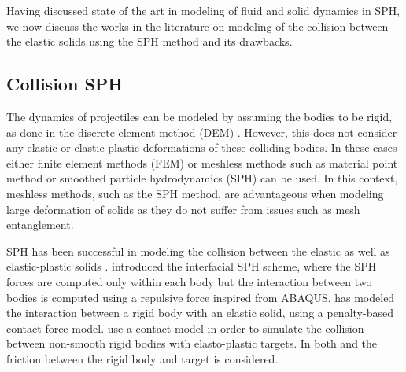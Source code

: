 Having discussed state of the art in modeling of fluid and solid dynamics in
SPH, we now discuss the works in the literature on modeling of the collision
between the elastic solids using the SPH method and its drawbacks.


\subsection{Collision SPH}
The dynamics of projectiles can be modeled by assuming the bodies to be
rigid, as done in the discrete element method (DEM) \citep{zhan2021surface}.
However, this does not consider any elastic or elastic-plastic deformations of
these colliding bodies. In these cases either finite element methods (FEM)
\citep{rodrigues2019elastic} or meshless methods such as material point
method\citep{sulsky1994particle} or smoothed particle hydrodynamics (SPH)
\citep{gingold1977smoothed} can be used. In this context, meshless methods, such
as the SPH method, are advantageous when modeling large deformation of solids as
they do not suffer from issues such as mesh entanglement.

SPH has been successful in modeling the collision between the elastic as well as
elastic-plastic solids \citep{gray2001sph, cleary2010elastoplastic}.
\cite{yan2021simulation} introduced the interfacial SPH scheme, where the SPH
forces are computed only within each body but the interaction between two bodies
is computed using a repulsive force inspired from ABAQUS.
\cite{vyas2021collisional} has modeled the interaction between a rigid body with
an elastic solid, using a penalty-based contact force model.
\cite{mohseni2021particle} use a contact model in order to simulate the
collision between non-smooth rigid bodies with elasto-plastic targets. In both
\citep{vyas2021collisional} and \citep{mohseni2021particle} the friction between
the rigid body and target is considered.


